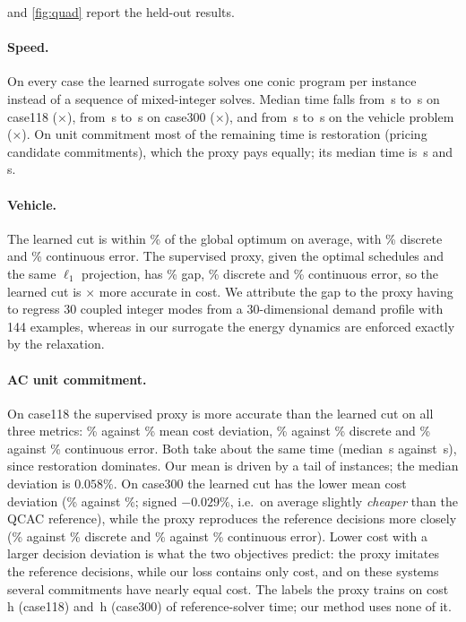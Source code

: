 \documentclass[10pt]{article}
\begin{document}
 and \cref{fig:quad} report the held-out results.

\paragraph{Speed.} On every case the learned surrogate solves one conic program per instance instead of a sequence of mixed-integer solves. Median time falls from \REFtimeA\,s to \OURtimeA\,s on case118 (\SPDA$\times$), from \REFtimeB\,s to \OURtimeB\,s on case300 (\SPDB$\times$), and from \REFtimeV\,s to \OURtimeV\,s on the vehicle problem (\SPDV$\times$). On unit commitment most of the remaining time is restoration (pricing candidate commitments), which the proxy pays equally; its median time is \PXtimeA\,s and \PXtimeB\,s.

\paragraph{Vehicle.} The learned cut is within \OURgapV\% of the global optimum on average, with \OURdiscV\% discrete and \OURcontV\% continuous error. The supervised proxy, given the optimal schedules and the same $\ell_1$ projection, has \PXgapV\% gap, \PXdiscV\% discrete and \PXcontV\% continuous error, so the learned cut is \VRATIO$\times$ more accurate in cost. We attribute the gap to the proxy having to regress 30 coupled integer modes from a 30-dimensional demand profile with 144 examples, whereas in our surrogate the energy dynamics are enforced exactly by the relaxation.

\paragraph{AC unit commitment.} On case118 the supervised proxy is more accurate than the learned cut on all three metrics: \PXgapA\% against \OURgapA\% mean cost deviation, \PXdiscA\% against \OURdiscA\% discrete and \PXcontA\% against \OURcontA\% continuous error. Both take about the same time (median \PXtimeA\,s against \OURtimeA\,s), since restoration dominates. Our mean is driven by a tail of instances; the median deviation is $0.058\%$. On case300 the learned cut has the lower mean cost deviation (\OURgapB\% against \PXgapB\%; signed $-0.029\%$, i.e.\ on average slightly \emph{cheaper} than the QCAC reference), while the proxy reproduces the reference decisions more closely (\PXdiscB\% against \OURdiscB\% discrete and \PXcontB\% against \OURcontB\% continuous error). Lower cost with a larger decision deviation is what the two objectives predict: the proxy imitates the reference decisions, while our loss contains only cost, and on these systems several commitments have nearly equal cost. The labels the proxy trains on cost \LABELHA\,h (case118) and \LABELHB\,h (case300) of reference-solver time; our method uses none of it.
\end{document}
